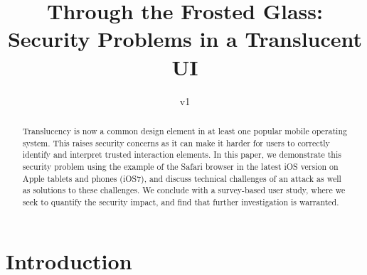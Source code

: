 \documentclass[twoside,letterpaper]{soups}
\begin{document}
\title{Through the Frosted Glass:\\Security Problems in a Translucent UI}%
\subtitle{v1}



\maketitle

\begin{abstract}
Translucency is now a common design element in at least one popular mobile operating system. This raises security concerns as it can make it harder for users to correctly identify and interpret trusted interaction elements. In this paper, we demonstrate this security problem using the example of the Safari browser in the latest iOS version on Apple tablets and phones (iOS7), and discuss technical challenges of an attack as well as solutions to these challenges. We conclude with a survey-based user study, where we seek to quantify the security impact, and find that further investigation is warranted.
\end{abstract}



\section{Introduction}

\end{document}
